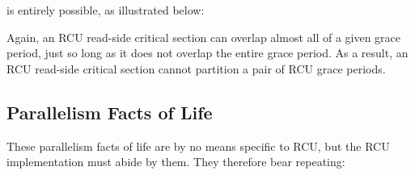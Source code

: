 \noindent%
is entirely possible, as illustrated below:

\begin{center}
\end{center}

Again, an RCU read-side critical section can overlap almost all of a
given grace period, just so long as it does not overlap the entire grace
period.
As a result, an RCU read-side critical section cannot partition
a pair of RCU grace periods.

\QuickQuizEnd


\subsection{Parallelism Facts of Life}

These parallelism facts of life are by no means specific to RCU, but the
RCU implementation must abide by them.
They therefore bear repeating:

